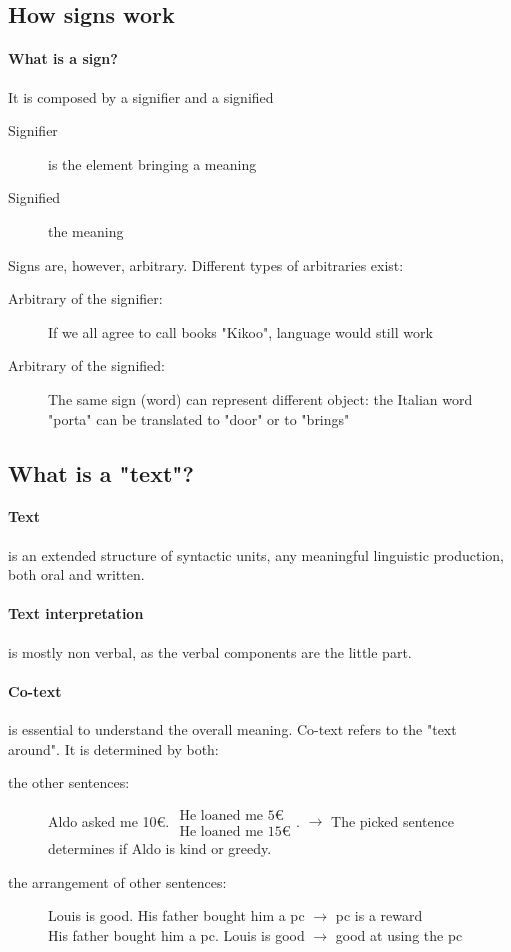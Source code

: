 \documentclass{article}
\begin{document}
\subsection{How signs work}
\label{subsec:singAndAmbiguity}
\paragraph{What is a sign?} It is composed by a signifier and a signified
\begin{description}
\item[Signifier] is the element bringing a meaning
\item[Signified] the meaning
\end{description}
Signs are, however, arbitrary. Different types of arbitraries exist:
\begin{description}
\item[Arbitrary of the signifier:] If we all agree to call books "Kikoo", language would still work
\item[Arbitrary of the signified:] The same sign (word) can represent different object: the Italian word "porta" can be translated to "door" or to "brings"
\end{description}

\subsection{What is a "text"?}
\paragraph{Text} is an extended structure of syntactic units, any meaningful linguistic production, both oral and written.\\
\paragraph{Text interpretation} is mostly non verbal, as the verbal components are the little part.
\paragraph{Co-text}  is essential to understand the overall meaning. Co-text refers to the "text around". It is determined by both:
\begin{description}
\item[the other sentences:] Aldo asked me 10€. $\substack{\text{He loaned me 5€}\\\text{He loaned me 15€}}$. $\rightarrow$ The picked sentence determines if Aldo is kind or greedy.
\item[the arrangement of other sentences:] Louis is good. His father bought him a pc $\rightarrow$ pc is a reward\\
His father bought him a pc. Louis is good $\rightarrow$ good at using the pc
\end{description}
\end{document}
